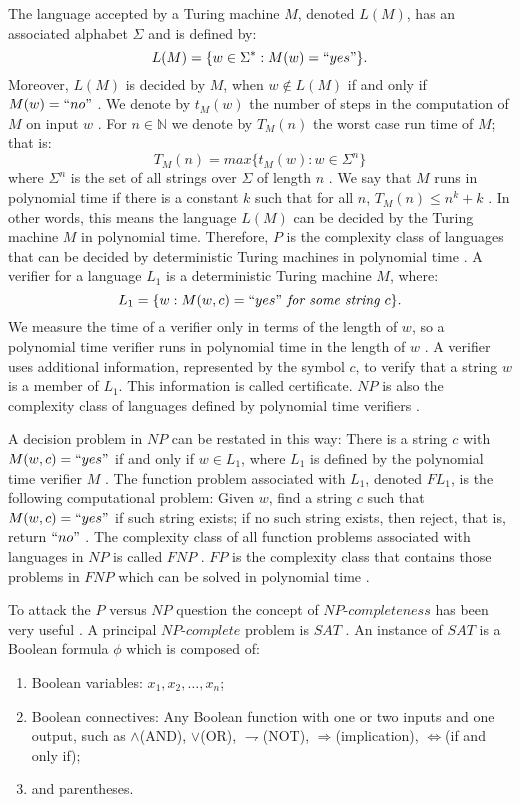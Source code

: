 \documentclass[a4paper,UKenglish,cleveref, autoref]{lipics-v2019}
\begin{document}
The language accepted by a Turing machine $M$, denoted $L(M)$, has an associated alphabet $\Sigma$ and is defined by:
\[L(M) = \{w \in \Sigma^{*}: M(w)=``yes" \}.\]
Moreover, $L(M)$ is decided by $M$, when $w \notin L(M)$ if and only if $M(w)=``no"$ \cite{CLRS01}. We denote by $t_{M}(w)$ the number of steps in the computation of $M$ on input $w$ \cite{AB09}. For $n \in \mathbb{N}$ we denote by $T_{M}(n)$ the worst case run time of $M$; that is:
\[T_{M}(n) = max\{t_{M}(w): w \in \Sigma^{n} \}\]
where $\Sigma^{n}$ is the set of all strings over $\Sigma$ of length $n$ \cite{AB09}. We say that $M$ runs in polynomial time if there is a constant $k$ such that for all $n$, $T_{M}(n) \leq n^{k} + k$ \cite{AB09}. In other words, this means the language $L(M)$ can be decided by the Turing machine $M$ in polynomial time. Therefore, $P$ is the complexity class of languages that can be decided by deterministic Turing machines in polynomial time \cite{CLRS01}. A verifier for a language $L_{1}$ is a deterministic Turing machine $M$, where:
\[L_{1} = \{w: M(w, c) = ``yes" \textit{ for some string } c\}.\]
We measure the time of a verifier only in terms of the length of $w$, so a polynomial time verifier runs in polynomial time in the length of $w$ \cite{AB09}. A verifier uses additional information, represented by the symbol $c$, to verify that a string $w$ is a member of $L_{1}$. This information is called certificate. $NP$ is also the complexity class of languages defined by polynomial time verifiers \cite{Pap03}.

A decision problem in $NP$ can be restated in this way: There is a string $c$ with $M(w, c) = ``yes"$ if and only if $w \in L_{1}$, where $L_{1}$ is defined by the polynomial time verifier $M$ \cite{Pap03}. The function problem associated with $L_{1}$, denoted $FL_{1}$, is the following computational problem: Given $w$, find a string $c$ such that $M(w, c) = ``yes"$ if such string exists; if no such string exists, then reject, that is, return $``no"$ \cite{Pap03}. The complexity class of all function problems associated with languages in $NP$ is called $FNP$ \cite{Pap03}. $FP$ is the complexity class that contains those problems in $FNP$ which can be solved in polynomial time \cite{Pap03}.

To attack the $P$ versus $NP$ question the concept of $\textit{NP-completeness}$ has been very useful \cite{GJ79}. A principal $\textit{NP-complete}$ problem is $SAT$ \cite{GJ79}. An instance of $SAT$ is a Boolean formula $\phi$ which is composed of:

\begin{enumerate}
\item Boolean variables: $x_{1}, x_{2},\ldots, x_{n}$;
\item Boolean connectives: Any Boolean function with one or two inputs and one output, such as $\wedge$(AND), $\vee$(OR), $\rightharpoondown$(NOT), $\Rightarrow$(implication), $\Leftrightarrow$(if and only if);
\item and parentheses.
\end{enumerate}
\end{document}
